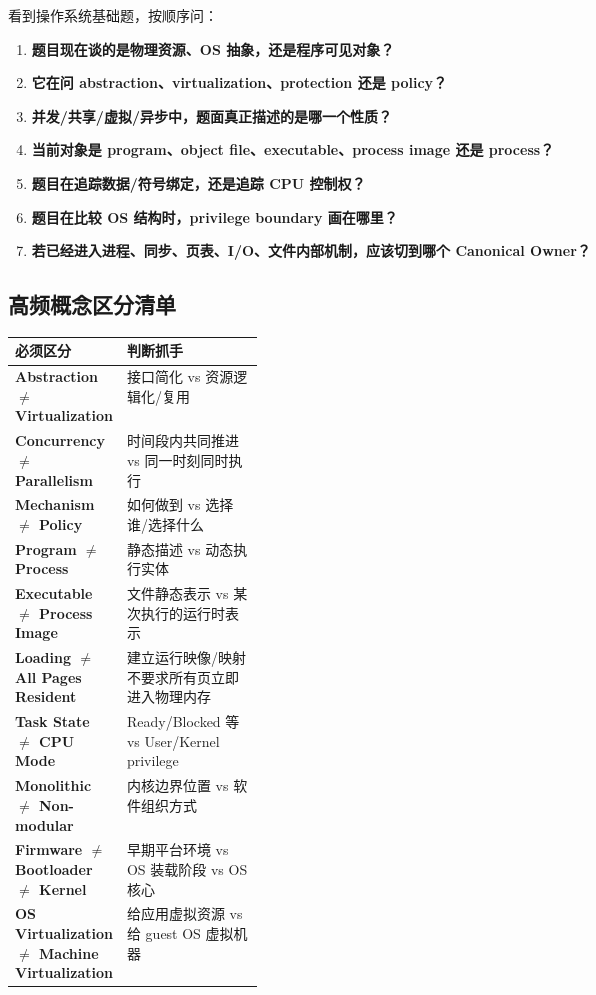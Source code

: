 \documentclass[11pt,a4paper]{ctexart}
\newcommand{\kw}[1]{\textbf{#1}}
\begin{document}
看到操作系统基础题，按顺序问：
\begin{enumerate}
  \item \kw{题目现在谈的是物理资源、OS 抽象，还是程序可见对象？}
  \item \kw{它在问 abstraction、virtualization、protection 还是 policy？}
  \item \kw{并发/共享/虚拟/异步中，题面真正描述的是哪一个性质？}
  \item \kw{当前对象是 program、object file、executable、process image 还是 process？}
  \item \kw{题目在追踪数据/符号绑定，还是追踪 CPU 控制权？}
  \item \kw{题目在比较 OS 结构时，privilege boundary 画在哪里？}
  \item \kw{若已经进入进程、同步、页表、I/O、文件内部机制，应该切到哪个 Canonical Owner？}
\end{enumerate}

\subsection{高频概念区分清单}

\begin{center}
\begin{tabularx}{\linewidth}{>{\bfseries}p{0.29\linewidth} X}
\toprule
必须区分 & 判断抓手\\
\midrule
Abstraction $\neq$ Virtualization & 接口简化 vs 资源逻辑化/复用\\
Concurrency $\neq$ Parallelism & 时间段内共同推进 vs 同一时刻同时执行\\
Mechanism $\neq$ Policy & 如何做到 vs 选择谁/选择什么\\
Program $\neq$ Process & 静态描述 vs 动态执行实体\\
Executable $\neq$ Process Image & 文件静态表示 vs 某次执行的运行时表示\\
Loading $\neq$ All Pages Resident & 建立运行映像/映射不要求所有页立即进入物理内存\\
Task State $\neq$ CPU Mode & Ready/Blocked 等 vs User/Kernel privilege\\
Monolithic $\neq$ Non-modular & 内核边界位置 vs 软件组织方式\\
Firmware $\neq$ Bootloader $\neq$ Kernel & 早期平台环境 vs OS 装载阶段 vs OS 核心\\
OS Virtualization $\neq$ Machine Virtualization & 给应用虚拟资源 vs 给 guest OS 虚拟机器\\
\bottomrule
\end{tabularx}
\end{center}
\end{document}

